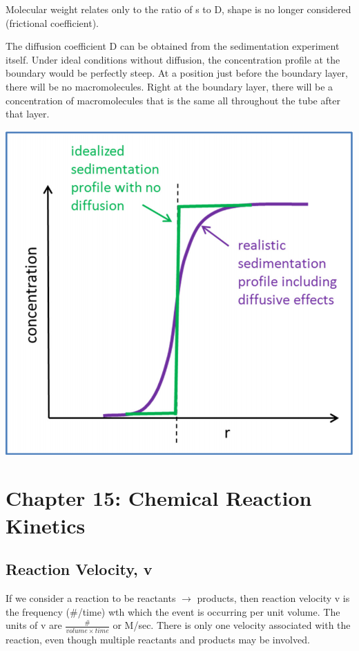 \documentclass[12pt, letterpaper]{article}
\begin{document}
    Molecular weight relates only to the ratio of s to D, shape is no longer considered (frictional coefficient). 
    
    \newpage
    The diffusion coefficient D can be obtained from the sedimentation experiment itself. Under ideal conditions without
    diffusion, the concentration profile at the boundary would be perfectly steep. At a position just before the boundary 
    layer, there will be no macromolecules. Right at the boundary layer, there will be a concentration of macromolecules
    that is the same all throughout the tube after that layer.  

    \begin{center}
        \includegraphics[scale = 0.70]{Sedimentation Profile.png}
    \end{center}

    \newpage

    \section*{Chapter 15: Chemical Reaction Kinetics}   
    \subsection*{Reaction Velocity, v}

    If we consider a reaction to be reactants $\rightarrow$ products, then reaction velocity v is the frequency
    (\#/time) wth which the event is occurring per unit volume. The units of v are \(\frac{\#}{volume \times time} \)
    or M/sec. There is only one velocity associated with the reaction, even though multiple reactants and products may be 
    involved. 
\end{document}
